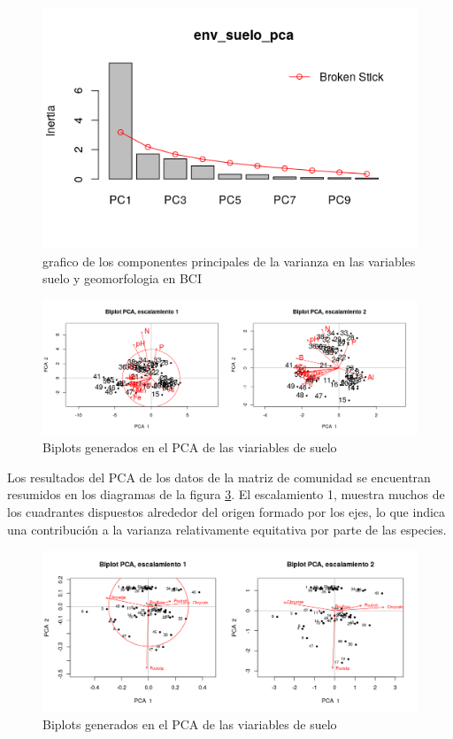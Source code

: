 \documentclass[11pt,]{article}
\begin{document}
\begin{figure}
\centering
\includegraphics{env_suelo_pca.png}
\caption{grafico de los componentes principales de la varianza en las
variables suelo y geomorfologia en BCI \label{fig:env_suelo_pca}}
\end{figure}

\begin{figure}
\centering
\includegraphics[width=1.00000\textwidth]{Biplot_PCA_escalamiento_actualizado.png}
\caption{Biplots generados en el PCA de las viariables de suelo
\label{fig:Biplot_PCA_escalamiento}}
\end{figure}

Los resultados del PCA de los datos de la matriz de comunidad se
encuentran resumidos en los diagramas de la figura
\ref{fig:PCA_comunidad}. El escalamiento 1, muestra muchos de los
cuadrantes dispuestos alrededor del origen formado por los ejes, lo que
indica una contribución a la varianza relativamente equitativa por parte
de las especies.

\begin{figure}
\centering
\includegraphics[width=1.00000\textwidth]{PCA_comunidad_actualizado.png}
\caption{Biplots generados en el PCA de las viariables de suelo
\label{fig:PCA_comunidad}}
\end{figure}
\end{document}
